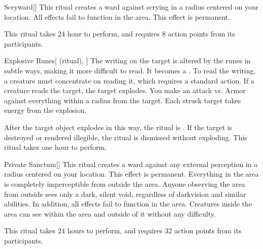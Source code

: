 \lowercase{\hypertarget{spell:Scryward}{}}\label{spell:Scryward}
\begin{apability}[\nth{2}]{\hypertarget{spell:Scryward}{Scryward}}[]
\targetrule
This ritual creates a ward against scrying in a \arealarge radius  centered on your location.
All  effects fail to function in the area.
This effect is permanent.

This ritual takes 24 hour to perform, and requires 8 action points from its participants.
\end{apability}
\vspace{0.25em}



\lowercase{\hypertarget{spell:Explosive Runes}{}}\label{spell:Explosive Runes}
\begin{attuneability}[\nth{3}]{\hypertarget{spell:Explosive Runes}{Explosive Runes}}[ (ritual), ]
The writing on the target is altered by the runes in subtle ways, making it more difficult to read.
It becomes a .
To read the writing, a creature must concentrate on reading it, which requires a standard action.
If a creature reads the target, the target explodes.
You make an attack vs. Armor against everything within a \areamed radius from the target.
Each struck target takes energy  from the explosion.

After the target object explodes in this way, the ritual is .
If the target is destroyed or rendered illegible, the ritual is dismissed without exploding.
This ritual takes one hour to perform.
\end{attuneability}
\vspace{0.25em}



\lowercase{\hypertarget{spell:Private Sanctum}{}}\label{spell:Private Sanctum}
\begin{apability}[\nth{4}]{\hypertarget{spell:Private Sanctum}{Private Sanctum}}[]
\targetrule
This ritual creates a ward against any external perception in a \arealarge radius  centered on your location.
This effect is permanent.
Everything in the area is completely imperceptible from outside the area.
Anyone observing the area from outside sees only a dark, silent void, regardless of darkvision and similar abilities.
In addition, all  effects fail to function in the area.
Creatures inside the area can see within the area and outside of it without any difficulty.

This ritual takes 24 hours to perform, and requires 32 action points from its participants.
\end{apability}
\vspace{0.25em}



